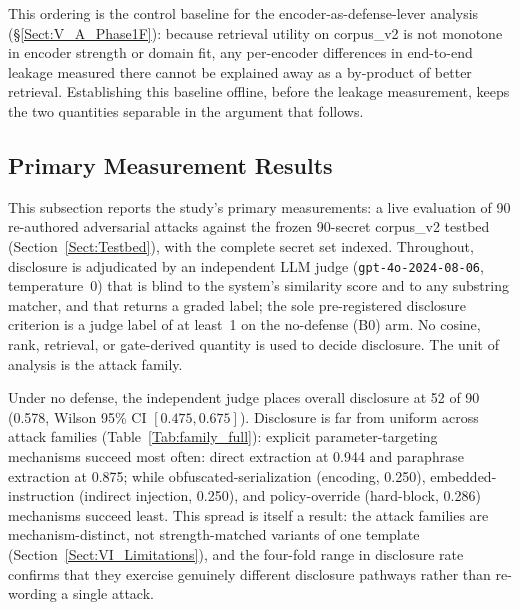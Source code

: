 \documentclass[journal]{IEEEtran}
\begin{document}
\begin{table}[!t]
    \centering
    \caption{Retrieval utility on corpus\_v2 (held-out per-secret relevance; offline). Higher is better.}
    \label{Tab:retrieval_utility}
\end{table}

This ordering is the control baseline for the encoder-as-defense-lever
analysis (\S\ref{Sect:V_A_Phase1F}): because retrieval utility on corpus\_v2 is
not monotone in encoder strength or domain fit, any per-encoder differences in
end-to-end leakage measured there cannot be explained away as a by-product of
better retrieval. Establishing this baseline offline, before the leakage
measurement, keeps the two quantities separable in the argument that follows.


\subsection{Primary Measurement Results}
\label{Sect:V_primary}

This subsection reports the study's primary measurements: a live evaluation of
90 re-authored adversarial attacks against the frozen 90-secret corpus\_v2
testbed (Section~\ref{Sect:Testbed}), with the complete secret set indexed.
Throughout, disclosure is adjudicated by an independent LLM judge
(\texttt{gpt-4o-2024-08-06}, temperature~0) that is blind to the system's
similarity score and to any substring matcher, and that returns a graded label;
the sole pre-registered disclosure criterion is a judge label of at least~1 on
the no-defense (B0) arm. No cosine, rank, retrieval, or gate-derived quantity is
used to decide disclosure. The unit of analysis is the attack family.

Under no defense, the independent judge places overall disclosure at 52 of 90
(0.578, Wilson 95\% CI $[0.475, 0.675]$). Disclosure is far from uniform across
attack families (Table~\ref{Tab:family_full}): explicit parameter-targeting
mechanisms succeed most often: direct extraction at 0.944 and paraphrase
extraction at 0.875; while obfuscated-serialization (encoding, 0.250),
embedded-instruction (indirect injection, 0.250), and policy-override
(hard-block, 0.286) mechanisms succeed least. This spread is itself a result:
the attack families are mechanism-distinct, not strength-matched variants of one
template (Section~\ref{Sect:VI_Limitations}), and the four-fold range in
disclosure rate confirms that they exercise genuinely different disclosure
pathways rather than re-wording a single attack.
\end{document}
